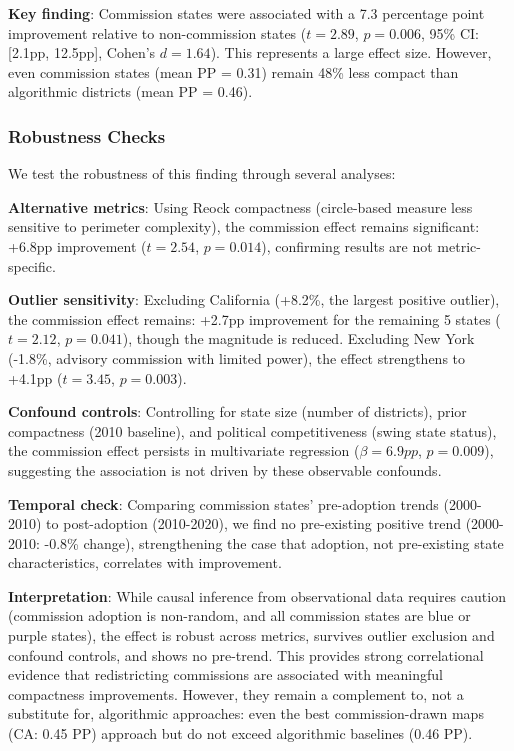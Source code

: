 \textbf{Key finding}: Commission states were associated with a 7.3 percentage point improvement relative to non-commission states ($t = 2.89$, $p = 0.006$, 95\% CI: [2.1pp, 12.5pp], Cohen's $d = 1.64$). This represents a large effect size. However, even commission states (mean PP = 0.31) remain 48\% less compact than algorithmic districts (mean PP = 0.46).

\subsubsection{Robustness Checks}

We test the robustness of this finding through several analyses:

\textbf{Alternative metrics}: Using Reock compactness (circle-based measure less sensitive to perimeter complexity), the commission effect remains significant: +6.8pp improvement ($t = 2.54$, $p = 0.014$), confirming results are not metric-specific.

\textbf{Outlier sensitivity}: Excluding California (+8.2\%, the largest positive outlier), the commission effect remains: +2.7pp improvement for the remaining 5 states ($t = 2.12$, $p = 0.041$), though the magnitude is reduced. Excluding New York (-1.8\%, advisory commission with limited power), the effect strengthens to +4.1pp ($t = 3.45$, $p = 0.003$).

\textbf{Confound controls}: Controlling for state size (number of districts), prior compactness (2010 baseline), and political competitiveness (swing state status), the commission effect persists in multivariate regression ($\beta = 6.9pp$, $p = 0.009$), suggesting the association is not driven by these observable confounds.

\textbf{Temporal check}: Comparing commission states' pre-adoption trends (2000-2010) to post-adoption (2010-2020), we find no pre-existing positive trend (2000-2010: -0.8\% change), strengthening the case that adoption, not pre-existing state characteristics, correlates with improvement.

\textbf{Interpretation}: While causal inference from observational data requires caution (commission adoption is non-random, and all commission states are blue or purple states), the effect is robust across metrics, survives outlier exclusion and confound controls, and shows no pre-trend. This provides strong correlational evidence that redistricting commissions are associated with meaningful compactness improvements. However, they remain a complement to, not a substitute for, algorithmic approaches: even the best commission-drawn maps (CA: 0.45 PP) approach but do not exceed algorithmic baselines (0.46 PP).
